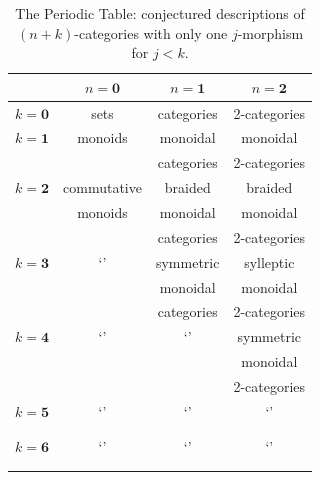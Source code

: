 \documentclass[12pt,twoside,openright]{report}
\begin{document}
\begin{table}[h]
\begin{center}
\begin{tabular}{|c|c|c|c|}  \hline
        & $\mathbf{\mathit n = 0}$ & $\mathbf{\mathit n = 1}$ &
$\mathbf{\mathit n = 2}$\\ \hline $\mathbf{\mathit k = 0}$ & sets
& categories & 2-categories     \\     \hline
$\mathbf{\mathit k = 1}$  & monoids   & monoidal   & monoidal         \\
        &           & categories & 2-categories     \\     \hline
$\mathbf{\mathit k = 2}$  &commutative& braided    & braided          \\
        & monoids   & monoidal   & monoidal         \\
        &           & categories & 2-categories     \\     \hline
$\mathbf{\mathit k = 3}$  &`'         & symmetric  & sylleptic \\
        &           & monoidal   & monoidal         \\
        &           & categories & 2-categories     \\     \hline
$\mathbf{\mathit k = 4}$  &`'         & `'         & symmetric \\
        &           &            & monoidal         \\
        &           &            & 2-categories     \\     \hline
$\mathbf{\mathit k = 5}$  &`'         &`'          & `'               \\
        &           &            &                  \\
        &           &            &                  \\     \hline
$\mathbf{\mathit k = 6}$  &`'         &`'          & `'               \\
        &           &            &                  \\
        &           &            &                  \\     \hline
\end{tabular}
\\
\caption{The Periodic Table: conjectured descriptions of $(n+k)$-categories with only one $j$-morphism for $j < k$.}
\label{periodic_table}
\end{center}
\end{table}
\end{document}
